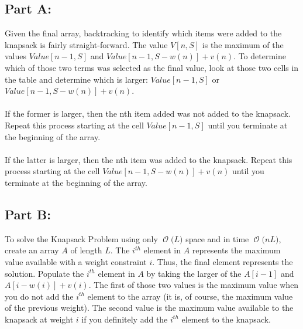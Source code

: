 \documentclass[12pt]{article}
\newcommand{\BigO}[1]{\ensuremath{\operatorname{\mathcal{O}}\bigl(#1\bigr)}}
\begin{document}
\subsection*{Part A:}

Given the final array, backtracking to identify which items were added to the knapsack is fairly straight-forward. The value $V[n, S]$ is the maximum of the values $Value[n-1, S]$ and $Value[n-1, S-w(n)] + v(n)$. To determine which of those two terms was selected as the final value, look at those two cells in the table and determine which is larger: $Value[n-1, S]$ or $Value[n-1, S-w(n)] + v(n)$.\\\\ 
If the former is larger, then the nth item added was not added to the knapsack. Repeat this process starting at the cell $Value[n-1, S]$ until you terminate at the beginning of the array.\\\\ 
If the latter is larger, then the nth item was added to the knapsack. Repeat this process starting at the cell $Value[n-1, S-w(n)] + v(n)$ until you terminate at the beginning of the array.
\subsection*{Part B:}
To solve the Knapsack Problem using only \BigO{L} space and in time \BigO{nL}, create an array $A$ of length $L$. The $i^{th}$ element in $A$ represents the maximum value available with a weight constraint $i$. Thus, the final element represents the solution. Populate the $i^{th}$ element in $A$ by taking the larger of the $A[i-1]$ and $A[i-w(i)] + v(i)$. The first of those two values is the maximum value when you do not add the $i^{th}$ element to the array (it is, of course, the maximum value of the previous weight). The second value is the maximum value available to the knapsack at weight $i$ if you definitely add the $i^{th}$ element to the knapsack.
\end{document}

